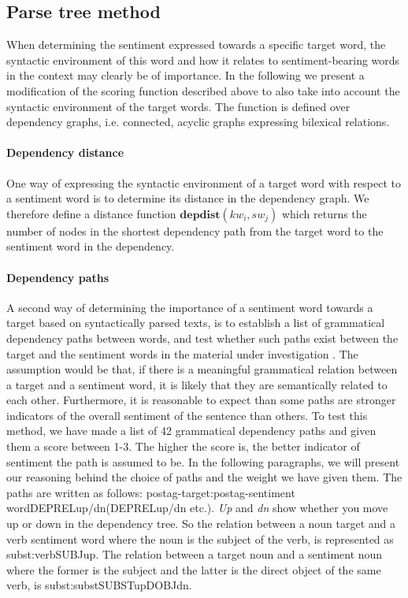 \documentclass[11pt]{article}
\begin{document}
\subsection{Parse tree method}
\label{sec:dp}
When determining the sentiment expressed towards a specific target
word, the syntactic environment of this word and how it relates to
sentiment-bearing words in the context may clearly be of importance.
In the following we present a modification of the scoring function described above to also take into account the syntactic environment of the target words. The function is defined over dependency graphs, i.e. connected, acyclic graphs expressing bilexical relations.

\paragraph{Dependency distance} One way of expressing the syntactic environment of a target word with respect to a sentiment word is to determine its distance in the dependency graph. We therefore define a distance function $\mathbf{depdist}(kw_i, sw_{j})$ which returns the number of nodes in the shortest dependency path from the target word to the sentiment word in the dependency.

\paragraph{Dependency paths}
A second way of determining the importance of a sentiment word towards a target based on syntactically parsed texts, is to establish a list of grammatical dependency paths between words, and test whether such paths exist between the target and the sentiment words in the material under investigation \cite{Jiang11}. The assumption would be that, if there is a meaningful grammatical relation between a target and a sentiment word, it is likely that they are semantically related to each other. Furthermore, it is reasonable to expect than some paths are stronger indicators of the overall sentiment of the sentence than others. To test this method, we have made a list of 42 grammatical dependency paths and given them a score between 1-3. The higher the score is, the better indicator of sentiment the path is assumed to be. In the following paragraphs, we will present our reasoning behind the choice of paths and the weight we have given them. The paths are written as follows: postag-target:postag-sentiment word{\textunderscore}{\textunderscore}DEPREL{\textunderscore}up/dn({\textunderscore}{\textunderscore}DEPREL{\textunderscore}up/dn etc.). \emph{Up} and \emph{dn} show whether you move up or down in the dependency tree. So the relation between a noun target and a verb sentiment word where the noun is the subject of the verb, is represented as subst:verb{\textunderscore}{\textunderscore}SUBJ{\textunderscore}up. The relation between a target noun and a sentiment noun where the former is the subject and the latter is the direct object of the same verb, is subst:subst{\textunderscore}{\textunderscore}SUBST{\textunderscore}up{\textunderscore}{\textunderscore}DOBJ{\textunderscore}dn.
\end{document}
